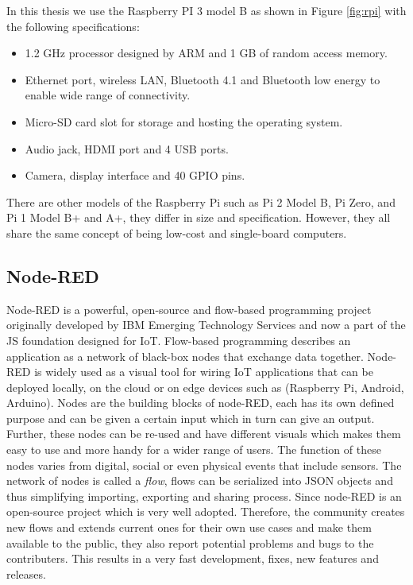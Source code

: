 \noindent In this thesis we use the Raspberry PI 3 model B as shown in Figure \ref{fig:rpi} with the following specifications:
\begin{itemize}
	\item 1.2 GHz processor designed by ARM and 1 GB of random access memory.
	\item Ethernet port, wireless LAN, Bluetooth 4.1 and Bluetooth low energy to enable wide range of connectivity.
	\item Micro-SD card slot for storage and hosting the operating system.
	\item Audio jack, HDMI port and 4 USB ports.
	\item Camera, display interface and 40 GPIO pins.
\end{itemize}

\noindent There are other models of the Raspberry Pi such as  Pi 2 Model B,  Pi Zero, and  Pi 1 Model B+ and A+, they differ in size and specification. However, they all share the same concept of being low-cost and single-board computers.



\subsection{Node-RED}
Node-RED \cite{NODE-RED} is a powerful, open-source and flow-based programming project originally developed by IBM Emerging Technology Services and now a part of the JS foundation designed for IoT. Flow-based programming describes an application as a network of black-box nodes that exchange data together.  Node-RED is widely used as a visual tool for wiring IoT applications that can be deployed locally, on the cloud or on edge devices such as (Raspberry Pi, Android, Arduino). Nodes are the building blocks of node-RED, each has its own defined purpose and can be given a certain input which in turn can give an output. Further, these nodes can be re-used and  have different visuals which makes them easy to use and more handy for a wider range of users. The function of these nodes varies from digital, social  or even physical events that include sensors. The network of nodes is called a  \textit{flow}, flows can be  serialized into JSON objects and thus simplifying  importing, exporting and sharing process. Since node-RED is an open-source project which is very well adopted. Therefore, the community creates new flows and extends current ones for their own use cases and make them available to the public, they also  report potential problems and bugs to the contributers. This results in a very fast development, fixes, new features and releases.\\

